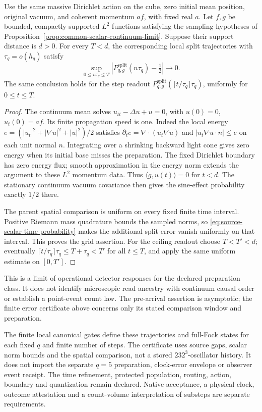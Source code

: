 \begin{proposition}
\label{prop:source-scalar-prearrival}
Use the same massive Dirichlet action on the cube, zero initial mean
position, original vacuum, and coherent momentum $af$, with fixed real
$a$. Let $f,g$ be bounded, compactly supported $L^2$ functions satisfying
the sampling hypotheses of Proposition~\ref{prop:common-scalar-continuum-limit}.
Suppose their support distance is $d>0$. For every $T<d$, the corresponding
local split trajectories with $\tau_q=o(h_q)$ satisfy
\[
 \sup_{0\le n\tau_q\le T}
 \left|P^{\mathrm{split}}_{q,g}(n\tau_q)-\tfrac12\right|\longrightarrow0.
\]
The same conclusion holds for the step readout
$P^{\mathrm{split}}_{q,g}(\lceil t/\tau_q\rceil\tau_q)$, uniformly for
$0\le t\le T$.
\end{proposition}
\begin{proof}
The continuum mean solves $u_{tt}-\Delta u+u=0$, with $u(0)=0$,
$u_t(0)=af$. Its finite propagation speed is one. Indeed the local energy
$e=(|u_t|^2+|\nabla u|^2+|u|^2)/2$ satisfies
$\partial_t e=\nabla\!\cdot(u_t\nabla u)$ and
$|u_t\nabla u\cdot n|\le e$ on each unit normal $n$.
Integrating over a shrinking backward light cone gives zero energy when
its initial base misses the preparation. The fixed Dirichlet boundary
has zero energy flux; smooth approximation in the energy norm extends the
argument to these $L^2$ momentum data. Thus $\langle g,u(t)\rangle=0$
for $t<d$. The stationary continuum vacuum covariance then gives the
sine-effect probability exactly $1/2$ there.

The parent spatial comparison is uniform on every fixed finite time
interval. Positive Riemann mass quadrature bounds the sampled norms,
so \eqref{eq:source-scalar-time-probability} makes the additional split
error vanish uniformly on that interval. This proves the grid assertion.
For the ceiling readout choose $T<T'<d$; eventually
$\lceil t/\tau_q\rceil\tau_q\le T+\tau_q<T'$ for all $t\le T$,
and apply the same uniform estimate on $[0,T']$.
\end{proof}

This is a limit of operational detector responses for the declared
preparation class. It does not identify microscopic read ancestry with
continuum causal order or establish a point-event count law. The
pre-arrival assertion is asymptotic; the finite error certificate above
concerns only its stated comparison window and preparation.

The finite local canonical gates define these trajectories and full-Fock
states for each fixed $q$ and finite number of steps. The certificate uses
source gaps, scalar norm bounds and the spatial comparison, not a stored
$232^3$-oscillator history. It does not import the separate $q=5$ preparation,
clock-error envelope or observer event receipt. The time refinement,
protected population, routing, action, boundary and quantization remain
declared. Native acceptance, a physical clock, outcome attestation and a
count-volume interpretation of substeps are separate requirements.
